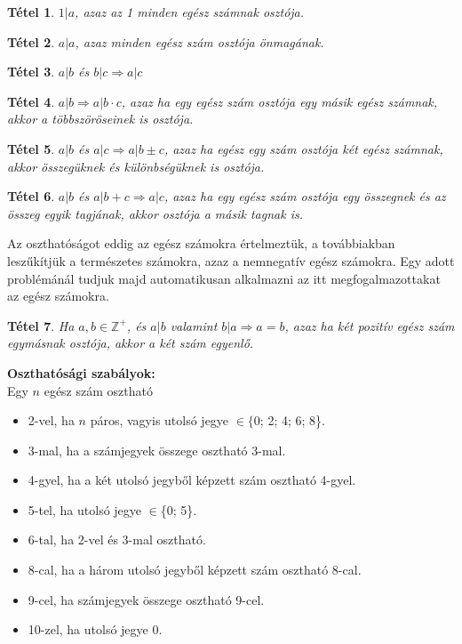 \documentclass[12pt,a4paper]{article}
\newtheorem{theorem}{Tétel} [section]
\begin{document}
\begin{theorem}
 $1|a$, azaz az 1 minden egész számnak osztója.
\end{theorem}

\begin{theorem}
 $a|a$, azaz minden egész szám osztója önmagának.
\end{theorem}

\begin{theorem}
$a|b$ és $b|c \Rightarrow a|c$
\end{theorem}

\begin{theorem}
$a|b \Rightarrow a|b \cdot c$, azaz ha egy egész szám osztója egy másik egész számnak, akkor a többszöröseinek is osztója.
\end{theorem}

\begin{theorem}
$a|b$ és $a|c \Rightarrow a|b \pm c$, azaz ha egész egy szám osztója két egész számnak, akkor összegüknek és különbségüknek is osztója.
\end{theorem}

\begin{theorem}
$a|b$ és $a|b + c \Rightarrow a|c$, azaz ha egy egész szám osztója egy összegnek és az összeg egyik tagjának, akkor osztója a másik tagnak is.
\end{theorem}

Az oszthatóságot eddig az egész számokra értelmeztük, a továbbiakban leszűkítjük a természetes számokra, azaz a nemnegatív egész számokra. Egy adott problémánál tudjuk majd automatikusan alkalmazni az itt megfogalmazottakat az egész számokra.

\begin{theorem}
Ha $a, b \in \mathbb{Z}^+$, és $a|b$ valamint $b|a \Rightarrow a = b$, azaz ha két pozitív egész szám egymásnak osztója, akkor a két szám egyenlő.
\end{theorem}
\newpage
\textbf{Oszthatósági szabályok:} \\ Egy $n$ egész szám osztható
\begin{itemize}
\item  2-vel, ha $n$ páros, vagyis utolsó jegye $\in \{$0; 2; 4; 6; 8\}.
\item 3-mal, ha a számjegyek összege osztható 3-mal.
\item 4-gyel, ha a két utolsó jegyből képzett szám osztható 4-gyel.
\item 5-tel, ha utolsó jegye $\in$\{0; 5\}.
\item 6-tal, ha 2-vel és 3-mal osztható.
\item 8-cal, ha a három utolsó jegyből képzett szám osztható 8-cal.
\item 9-cel, ha számjegyek összege osztható 9-cel.
\item 10-zel, ha utolsó jegye 0.
\end{itemize}
\end{document}
